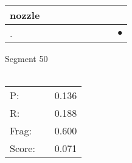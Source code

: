 \documentclass[landscape]{article}
\newcommand{\ssp}{\hspace{2pt}}
\newcommand{\mex}{\cellcolor{g}$\bullet$}
\begin{document}
\begin{tabular}{|l|p{10pt}|p{10pt}|p{10pt}|p{10pt}|p{10pt}|p{10pt}|p{10pt}|p{10pt}|}
\hline
\ssp nozzle \ssp&\hspace{2pt}&\hspace{2pt}&\hspace{2pt}&\hspace{2pt}&\hspace{2pt}&\hspace{2pt}&\hspace{2pt}&\hspace{2pt}\\
\hline
\ssp \cellcolor{ref7}. \ssp&\hspace{2pt}&\hspace{2pt}&\hspace{2pt}&\hspace{2pt}&\hspace{2pt}&\hspace{2pt}&\hspace{2pt}&\hspace{2pt}\mex\\
\hline
\end{tabular}

\vspace{6pt}
\noindent Segment 50\\\\
\noindent\begin{tabular}{lm{12pt}r}
\hline
P:&&0.136\\
R:&&0.188\\
Frag:&&0.600\\
Score:&&0.071\\
\end{tabular}

\newpage
\end{document}
